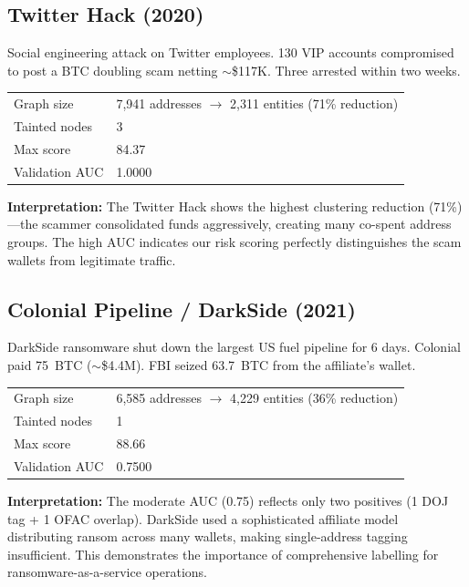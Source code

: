 \documentclass[a4paper,11pt]{article}
\begin{document}
\subsection{Twitter Hack (2020)}

Social engineering attack on Twitter employees. 130 VIP accounts compromised to post a BTC doubling scam netting $\sim$\$117K. Three arrested within two weeks.

\begin{table}[H]
\centering
\begin{tabular}{@{}ll@{}}
\toprule
Graph size & 7{,}941 addresses $\to$ 2{,}311 entities (71\% reduction) \\
Tainted nodes & 3 \\
Max score & 84.37 \\
Validation AUC & 1.0000 \\
\bottomrule
\end{tabular}
\end{table}

\textbf{Interpretation:} The Twitter Hack shows the highest clustering reduction (71\%)---the scammer consolidated funds aggressively, creating many co-spent address groups. The high AUC indicates our risk scoring perfectly distinguishes the scam wallets from legitimate traffic.

\subsection{Colonial Pipeline / DarkSide (2021)}

DarkSide ransomware shut down the largest US fuel pipeline for 6 days. Colonial paid 75~BTC ($\sim$\$4.4M). FBI seized 63.7~BTC from the affiliate's wallet.

\begin{table}[H]
\centering
\begin{tabular}{@{}ll@{}}
\toprule
Graph size & 6{,}585 addresses $\to$ 4{,}229 entities (36\% reduction) \\
Tainted nodes & 1 \\
Max score & 88.66 \\
Validation AUC & 0.7500 \\
\bottomrule
\end{tabular}
\end{table}

\textbf{Interpretation:} The moderate AUC (0.75) reflects only two positives (1 DOJ tag + 1 OFAC overlap). DarkSide used a sophisticated affiliate model distributing ransom across many wallets, making single-address tagging insufficient. This demonstrates the importance of comprehensive labelling for ransomware-as-a-service operations.
\end{document}
